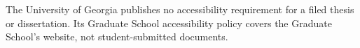 

	{The University of Georgia publishes no accessibility requirement for a
	 filed thesis or dissertation. Its Graduate School accessibility policy
	 covers the Graduate School's website, not student-submitted documents.}

%
\providecommand{\thesispriordegrees}{}

